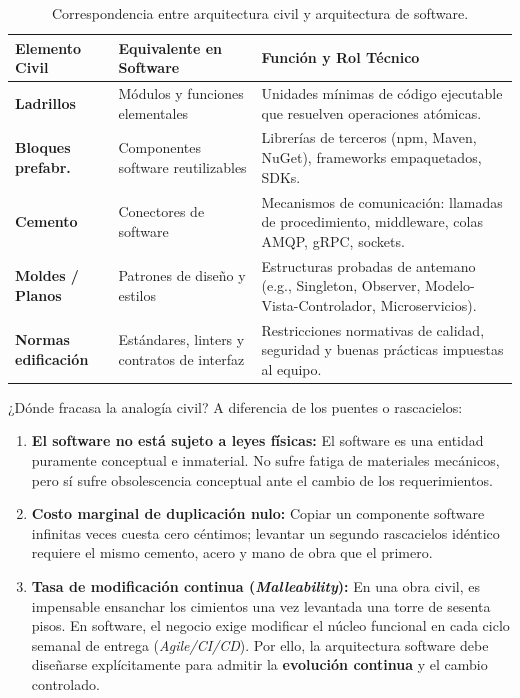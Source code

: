 \begin{table}[htbp]
\centering
\small
\begin{tabularx}{\textwidth}{l p{5.5cm} p{6.5cm}}
\toprule
\textbf{Elemento Civil} & \textbf{Equivalente en Software} & \textbf{Función y Rol Técnico} \\
\midrule
\textbf{Ladrillos} & Módulos y funciones elementales & Unidades mínimas de código ejecutable que resuelven operaciones atómicas. \\
\addlinespace
\textbf{Bloques prefabr.} & Componentes software reutilizables & Librerías de terceros (npm, Maven, NuGet), frameworks empaquetados, SDKs. \\
\addlinespace
\textbf{Cemento} & Conectores de software & Mecanismos de comunicación: llamadas de procedimiento, middleware, colas AMQP, gRPC, sockets. \\
\addlinespace
\textbf{Moldes / Planos} & Patrones de diseño y estilos & Estructuras probadas de antemano (e.g., Singleton, Observer, Modelo-Vista-Controlador, Microservicios). \\
\addlinespace
\textbf{Normas edificación} & Estándares, linters y contratos de interfaz & Restricciones normativas de calidad, seguridad y buenas prácticas impuestas al equipo. \\
\bottomrule
\end{tabularx}
\caption{Correspondencia entre arquitectura civil y arquitectura de software.}
\label{tab:analogia-civil}
\end{table}

\begin{importante}{¿Dónde fracasa la analogía civil?}
A diferencia de los puentes o rascacielos:
\begin{enumerate}[leftmargin=1.5em]
  \item \textbf{El software no está sujeto a leyes físicas:} El software es una entidad puramente conceptual e inmaterial. No sufre fatiga de materiales mecánicos, pero sí sufre obsolescencia conceptual ante el cambio de los requerimientos.
  \item \textbf{Costo marginal de duplicación nulo:} Copiar un componente software infinitas veces cuesta cero céntimos; levantar un segundo rascacielos idéntico requiere el mismo cemento, acero y mano de obra que el primero.
  \item \textbf{Tasa de modificación continua (\emph{Malleability}):} En una obra civil, es impensable ensanchar los cimientos una vez levantada una torre de sesenta pisos. En software, el negocio exige modificar el núcleo funcional en cada ciclo semanal de entrega (\emph{Agile/CI/CD}). Por ello, la arquitectura software debe diseñarse explícitamente para admitir la \textbf{evolución continua} y el cambio controlado.
\end{enumerate}
\end{importante}

